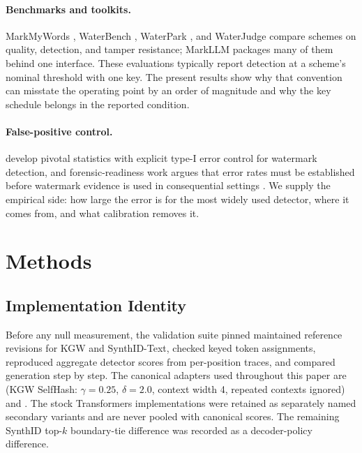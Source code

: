 \documentclass[conference]{IEEEtran}
\begin{document}
\paragraph{Benchmarks and toolkits.}
MarkMyWords \citep{piet2023markmywords}, WaterBench \citep{tu2024waterbench},
WaterPark \citep{liang2025waterpark}, and WaterJudge \citep{molenda2024waterjudge}
compare schemes on quality, detection, and tamper resistance; MarkLLM
\citep{pan2024markllm} packages many of them behind one interface. These
evaluations typically report detection at a scheme's nominal threshold with one
key. The present results show why that convention can misstate the operating
point by an order of magnitude and why the key schedule belongs in the reported
condition.

\paragraph{False-positive control.}
\citet{li2024statistical} develop pivotal statistics with explicit type-I error
control for watermark detection, and forensic-readiness work argues that error
rates must be established before watermark evidence is used in consequential
settings \citep{tamim2026forensic}. We supply the empirical side: how large the
error is for the most widely used detector, where it comes from, and what
calibration removes it.

\section{Methods}

\subsection{Implementation Identity}

Before any null measurement, the validation suite pinned maintained reference
revisions for KGW and SynthID-Text, checked keyed token assignments, reproduced
aggregate detector scores from per-position traces, and compared generation step by
step. The canonical adapters used throughout this paper are
 (KGW SelfHash: $\gamma=0.25$, $\delta=2.0$, context
width 4, repeated contexts ignored) and . The stock
Transformers implementations were retained as separately named secondary variants
and are never pooled with canonical scores. The remaining SynthID top-$k$
boundary-tie difference was recorded as a decoder-policy difference.
\end{document}
